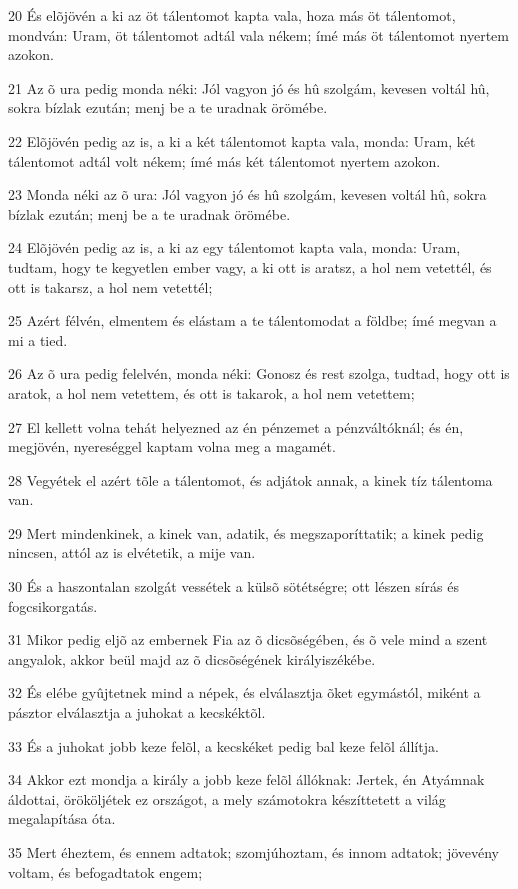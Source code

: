 \par 20 És elõjövén a ki az öt tálentomot kapta vala, hoza más öt tálentomot, mondván: Uram, öt tálentomot adtál vala nékem; ímé más öt tálentomot nyertem azokon.
\par 21 Az õ ura pedig monda néki: Jól vagyon jó és hû szolgám, kevesen voltál hû, sokra bízlak ezután; menj be a te uradnak örömébe.
\par 22 Elõjövén pedig az is, a ki a két tálentomot kapta vala, monda: Uram, két tálentomot adtál volt nékem; ímé más két tálentomot nyertem azokon.
\par 23 Monda néki az õ ura: Jól vagyon jó és hû szolgám, kevesen voltál hû, sokra bízlak ezután; menj be a te uradnak örömébe.
\par 24 Elõjövén pedig az is, a ki az egy tálentomot kapta vala, monda: Uram, tudtam, hogy te kegyetlen ember vagy, a ki ott is aratsz, a hol nem vetettél, és ott is takarsz, a hol nem vetettél;
\par 25 Azért félvén, elmentem és elástam a te tálentomodat a földbe; ímé megvan a mi a tied.
\par 26 Az õ ura pedig felelvén, monda néki: Gonosz és rest szolga, tudtad, hogy ott is aratok, a hol nem vetettem, és ott is takarok, a hol nem vetettem;
\par 27 El kellett volna tehát helyezned az én pénzemet a pénzváltóknál; és én, megjövén, nyereséggel kaptam volna meg a magamét.
\par 28 Vegyétek el azért tõle a tálentomot, és adjátok annak, a kinek tíz tálentoma van.
\par 29 Mert mindenkinek, a kinek van, adatik, és megszaporíttatik; a kinek pedig nincsen, attól az is elvétetik, a mije van.
\par 30 És a haszontalan szolgát vessétek a külsõ sötétségre; ott lészen sírás és fogcsikorgatás.
\par 31 Mikor pedig eljõ az embernek Fia az õ dicsõségében, és õ vele mind a szent angyalok, akkor beül majd az õ dicsõségének királyiszékébe.
\par 32 És elébe gyûjtetnek mind a népek, és elválasztja õket egymástól, miként a pásztor elválasztja a juhokat a kecskéktõl.
\par 33 És a juhokat jobb keze felõl, a kecskéket pedig bal keze felõl állítja.
\par 34 Akkor ezt mondja a király a jobb keze felõl állóknak: Jertek, én Atyámnak áldottai, örököljétek ez országot, a mely számotokra készíttetett a világ megalapítása óta.
\par 35 Mert éheztem, és ennem adtatok; szomjúhoztam, és innom adtatok; jövevény voltam, és befogadtatok engem;

